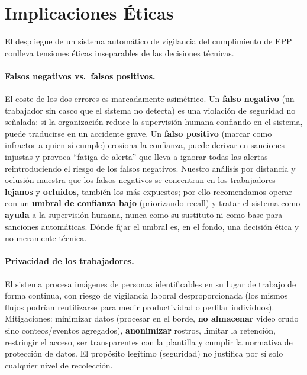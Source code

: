 \documentclass{article}
\begin{document}
\section{Implicaciones Éticas}
\label{sec:etica}
El despliegue de un sistema automático de vigilancia del cumplimiento de EPP
conlleva tensiones éticas inseparables de las decisiones técnicas.

\paragraph{Falsos negativos vs.\ falsos positivos.}
El coste de los dos errores es marcadamente asimétrico. Un \textbf{falso negativo}
(un trabajador sin casco que el sistema no detecta) es una violación de seguridad
no señalada: si la organización reduce la supervisión humana confiando en el
sistema, puede traducirse en un accidente grave. Un \textbf{falso positivo}
(marcar como infractor a quien sí cumple) erosiona la confianza, puede derivar en
sanciones injustas y provoca ``fatiga de alerta'' que lleva a ignorar todas las
alertas --- reintroduciendo el riesgo de los falsos negativos. Nuestro análisis por
distancia y oclusión muestra que los falsos negativos se concentran en los
trabajadores \textbf{lejanos} y \textbf{ocluidos}, también los más expuestos; por
ello recomendamos operar con un \textbf{umbral de confianza bajo} (priorizando
recall) y tratar el sistema como \textbf{ayuda} a la supervisión humana, nunca como
su sustituto ni como base para sanciones automáticas. Dónde fijar el umbral es, en
el fondo, una decisión ética y no meramente técnica.

\paragraph{Privacidad de los trabajadores.}
El sistema procesa imágenes de personas identificables en su lugar de trabajo de
forma continua, con riesgo de vigilancia laboral desproporcionada (los mismos
flujos podrían reutilizarse para medir productividad o perfilar individuos).
Mitigaciones: minimizar datos (procesar en el borde, \textbf{no almacenar} video
crudo sino conteos/eventos agregados), \textbf{anonimizar} rostros, limitar la
retención, restringir el acceso, ser transparentes con la plantilla y cumplir la
normativa de protección de datos. El propósito legítimo (seguridad) no justifica
por sí solo cualquier nivel de recolección.
\end{document}
